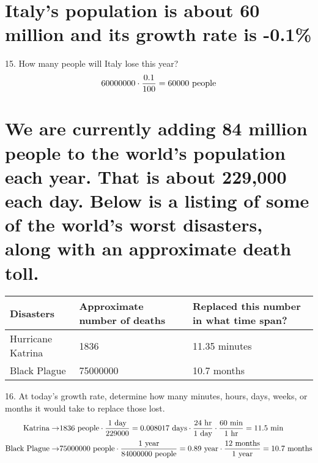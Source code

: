 \documentclass[11pt]{article}
\newcommand*{\set}{\setcounter{equation}{0}}
\begin{document}
\section{Italy’s population is about 60 million and its growth rate is -0.1\%}
15. How many people will Italy lose this year?
\begin{align}
    \set
    60000000\cdot\frac{0.1}{100}=60000\,\,\text{people}
\end{align}

\section{We are currently adding 84 million people to the world’s population each year.  That is about 229,000 each day. Below is a listing of some of the world’s worst disasters, along with an approximate death toll.}
\begin{flushleft}
    \begin{table}[h]
        \begin{tabular}{|l|l|l|} %
        \hline
        Disasters & Approximate number of deaths & Replaced this number in what time span?\\ \hline
        Hurricane Katrina & 1836 & 11.35 minutes\\ \hline
        Black Plague & 75000000 & 10.7 months\\
        \hline
        \end{tabular}
    \end{table}
\end{flushleft}
16. At today’s growth rate, determine how many minutes, hours, days, weeks, or months it would take to replace those lost.
\begin{align}
    \set
    \text{Katrina}\rightarrow&1836\,\,\text{people}\cdot\frac{1\,\,\text{day}}{229000}=0.008017\,\,\text{days}\cdot\frac{24\,\,\text{hr}}{1\,\,\text{day}}\cdot\frac{60\,\,\text{min}}{1\,\,\text{hr}}=11.5\,\,\text{min}\\
    \text{Black Plague}\rightarrow&75000000\,\,\text{people}\cdot\frac{1\,\,\text{year}}{84000000\,\,\text{people}}=0.89\,\,\text{year}\cdot\frac{12\,\,\text{months}}{1\,\,\text{year}}=10.7\,\,\text{months}
\end{align}
\end{document}
